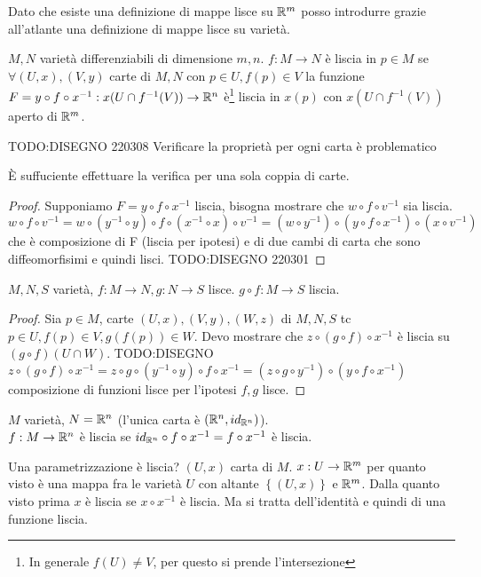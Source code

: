 Dato che esiste una definizione di mappe lisce su $\mathbb{R}^m$ posso
introdurre grazie all'atlante una definizione di mappe lisce su
varietà.
\begin{definition}
    $M,N$ varietà differenziabili di dimensione $m,n$.
    $f:M\rightarrow N$ è liscia in $p\in M$ se $\forall (U,x), (V,y)$
    carte di $M,N$ con $p\in U,f(p)\in V$ la funzione  $F=y\circ
    f\circ x^{-1}: x(U\cap f^{-1}(V))\rightarrow\mathbb{R}^n$ è\footnote{In
    generale $f(U)\neq V$, per questo si prende l'intersezione}
    liscia in $x(p)$ con $x(U\cap f^{-1}(V))$ aperto di $\mathbb{R}^m$.
\end{definition}
TODO:DISEGNO 220308
Verificare la proprietà per ogni carta è problematico
\begin{obs}
    È suffuciente effettuare la verifica per una sola coppia di
    carte.
\end{obs}
\begin{proof}
    Supponiamo $F=y\circ f\circ x^{-1}$ liscia, bisogna mostrare
    che $w\circ f\circ v^{-1}$ sia liscia.
    $w\circ f\circ v^{-1}=w\circ (y^{-1}\circ y)\circ f\circ
    (x^{-1}\circ x)\circ v^{-1}=(w\circ y^{-1})\circ (y\circ f\circ
    x^{-1})\circ (x\circ v^{-1})$ che è composizione di F (liscia
    per ipotesi) e di due cambi di carta che sono diffeomorfisimi e
    quindi lisci.
    TODO:DISEGNO 220301
\end{proof}
\begin{obs}
    $M,N,S$ varietà, $f:M\rightarrow N, g:N\rightarrow S$ lisce.
    $g\circ f:M\rightarrow S$ liscia.
\end{obs}
\begin{proof}
    Sia $p\in M$, carte $(U,x),(V,y),(W,z)$ di $M,N,S$ tc $p\in
    U,f(p)\in V,g(f(p))\in W$. Devo mostrare che $z\circ(g\circ
    f)\circ x^{-1}$ è liscia su $(g\circ f)(U\cap W)$.
    TODO:DISEGNO
    $z\circ(g\circ f)\circ x^{-1}=z\circ g \circ (y^{-1}\circ y)
    \circ f\circ x^{-1}=(z\circ g \circ y^{-1})\circ (y \circ
    f\circ x^{-1})$ composizione di funzioni lisce per l'ipotesi
    $f,g$ lisce.
\end{proof}

\begin{ex}
    $M$ varietà, $N=\mathbb{R}^n$ (l'unica carta è $(\mathbb{R}^n,id_{\mathbb{R}^n})$).\\
    $f:M\rightarrow \mathbb{R}^n$ è liscia se $id_{\mathbb{R}^n}\circ f\circ
    x^{-1}=f\circ x^{-1}$ è liscia.
\end{ex}
\begin{ex}
    Una parametrizzazione è liscia? $(U,x)$ carta di $M$.
    $x:U\rightarrow \mathbb{R}^m$ per quanto visto è una mappa fra le
    varietà $U$ con altante $\left\{ (U,x) \right\}$ e $\mathbb{R}^m$.
    Dalla quanto visto prima $x$ è liscia se $x \circ x^{-1}$ è
    liscia. Ma si tratta dell'identità e quindi di una funzione
    liscia.
    
\end{ex}
